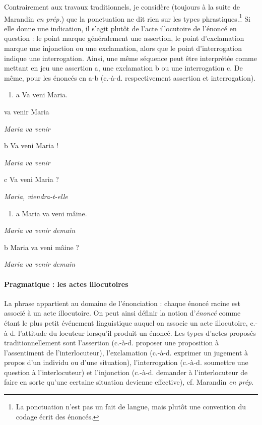 Contrairement aux travaux traditionnels, je considère (toujours à la suite de Marandin \textit{en prép.}) que la ponctuation ne dit rien sur les types phrastiques.\footnote{La ponctuation n'est pas un fait de langue, mais plutôt une convention du codage écrit des énoncés.}  Si elle donne une indication, il s'agit plutôt de l'acte illocutoire de l'énoncé en question : le point marque généralement une assertion, le point d'exclamation marque une injonction ou une exclamation, alors que le point d'interrogation indique une interrogation. Ainsi, une même séquence peut être interprétée comme mettant en jeu une assertion a, une exclamation b ou une interrogation c. De même, pour les énoncés en a-b (c.-à-d. respectivement assertion et interrogation).


\begin{enumerate}
\item \label{bkm:Ref299129450}a  Va  veni  Maria.


\end{enumerate}
va  venir  Maria

{\itshape
Maria va venir~}

  b  Va veni Maria !

{\itshape
Maria va venir~}

  c  Va veni Maria ?

{\itshape
Maria, viendra-t-elle~}


\begin{enumerate}
\item \label{bkm:Ref299129513}a  Maria va veni mâine. 


\end{enumerate}
{\itshape
Maria va venir demain}

  b  Maria va veni mâine ?

{\itshape
Maria va venir demain}

\paragraph[Pragmatique~: les actes illocutoires]{Pragmatique : les actes illocutoires}
La phrase appartient au domaine de l'énonciation : chaque énoncé racine est associé à un acte illocutoire. On peut ainsi définir la notion d'\textit{énoncé} comme étant le plus petit événement linguistique auquel on associe un acte illocutoire, c.-à-d. l'attitude du locuteur lorsqu'il produit un énoncé. Les types d'actes proposés traditionnellement sont l'assertion (c.-à-d. proposer une proposition à l'assentiment de l'interlocuteur), l'exclamation (c.-à-d. exprimer un jugement à propos d'un individu ou d'une situation), l'interrogation (c.-à-d. soumettre une question à l'interlocuteur) et l'injonction (c.-à-d. demander à l'interlocuteur de faire en sorte qu'une certaine situation devienne effective), cf. Marandin \textit{en prép}.  


